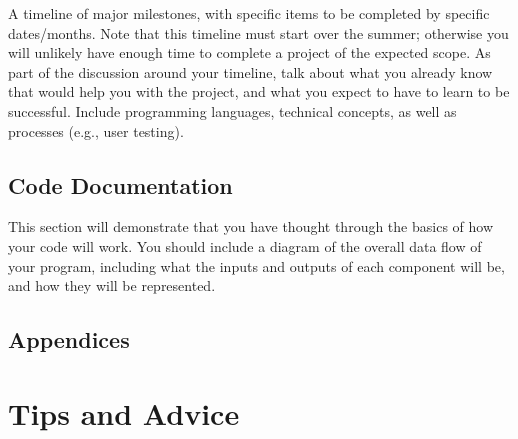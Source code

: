 \documentclass[10pt,twocolumn]{article}
\begin{document}
A timeline of major milestones, with specific items to be completed by specific dates/months.
Note that this timeline must start over the summer; otherwise you will unlikely have enough time to complete a project of the expected scope.
As part of the discussion around your timeline, talk about what you already know that would help you with the project, and what you expect to have to learn to be successful.
Include programming languages, technical concepts, as well as processes (e.g., user testing).

\subsection{Code Documentation}

This section will demonstrate that you have thought through the basics of how your code will work. You should include a diagram of the overall data flow of your program, including what the inputs and outputs of each component will be, and how they will be represented.

\subsection{Appendices}

\section{Tips and Advice}

\printbibliography
\end{document}

